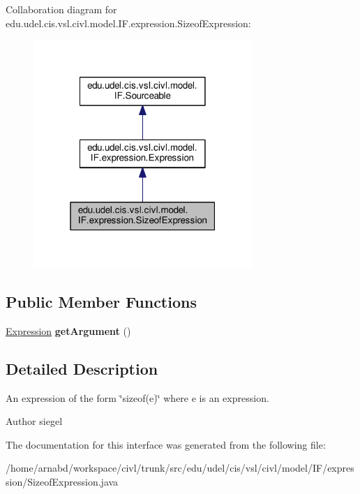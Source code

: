 Collaboration diagram for edu.\+udel.\+cis.\+vsl.\+civl.\+model.\+I\+F.\+expression.\+Sizeof\+Expression\+:
\nopagebreak
\begin{figure}[H]
\begin{center}
\leavevmode
\includegraphics[width=235pt]{interfaceedu_1_1udel_1_1cis_1_1vsl_1_1civl_1_1model_1_1IF_1_1expression_1_1SizeofExpression__coll__graph}
\end{center}
\end{figure}
\subsection*{Public Member Functions}
\begin{DoxyCompactItemize}
\item 
\hypertarget{interfaceedu_1_1udel_1_1cis_1_1vsl_1_1civl_1_1model_1_1IF_1_1expression_1_1SizeofExpression_ae3742f64b564148613c34d1f0d89417a}{}\hyperlink{interfaceedu_1_1udel_1_1cis_1_1vsl_1_1civl_1_1model_1_1IF_1_1expression_1_1Expression}{Expression} {\bfseries get\+Argument} ()\label{interfaceedu_1_1udel_1_1cis_1_1vsl_1_1civl_1_1model_1_1IF_1_1expression_1_1SizeofExpression_ae3742f64b564148613c34d1f0d89417a}

\end{DoxyCompactItemize}


\subsection{Detailed Description}
An expression of the form \char`\"{}sizeof(e)\char`\"{} where e is an expression. 

\begin{DoxyAuthor}{Author}
siegel 
\end{DoxyAuthor}


The documentation for this interface was generated from the following file\+:\begin{DoxyCompactItemize}
\item 
/home/arnabd/workspace/civl/trunk/src/edu/udel/cis/vsl/civl/model/\+I\+F/expression/Sizeof\+Expression.\+java\end{DoxyCompactItemize}
